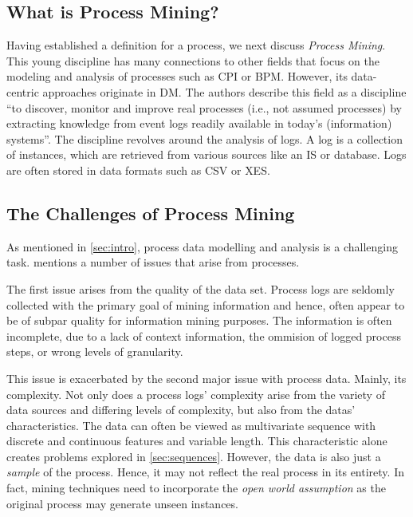 \documentclass[./../../paper.tex]{subfiles}
\begin{document}
\subsection{What is Process Mining?}
Having established a definition for a process, we next discuss \emph{Process Mining}. This young discipline has many connections to other fields that focus on the modeling and analysis of processes such as \gls{CPI} or \gls{BPM}\autocite{vanderaalst_ProcessMiningManifesto_2012}. However, its data-centric approaches originate in \gls{DM}.
The authors \citeauthor{vanderaalst_ProcessMiningManifesto_2012} describe this field as a discipline \enquote{to discover, monitor and improve real processes (i.e., not assumed processes) by extracting knowledge from event logs readily available in today's (information) systems}\autocite{vanderaalst_ProcessMiningManifesto_2012}. The discipline revolves around the analysis of \glspl{log}.
A \gls{log} is a collection of \glspl{instance}, which are retrieved from various sources like an \gls{IS} or database. Logs are often stored in data formats such as \gls{CSV} or \gls{XES}\needscite{}.

\subsection{The Challenges of Process Mining}
As mentioned in \autoref{sec:intro}, process data modelling and analysis is a challenging task. \citeauthor{vanderaalst_ProcessMiningManifesto_2012} mentions a number of issues that arise from processes\autocite{vanderaalst_ProcessMiningManifesto_2012}.

The first issue arises from the quality of the data set. Process logs are seldomly collected with the primary goal of mining information and hence, often appear to be of subpar quality for information mining purposes. The information is often incomplete, due to a lack of context information, the ommision of logged process steps, or wrong levels of granularity\autocite{vanderaalst_ProcessMiningManifesto_2012}.

This issue is exacerbated by the second major issue with process data. Mainly, its complexity. Not only does a process logs' complexity arise from the variety of data sources and differing levels of complexity, but also from the datas' characteristics. The data can often be viewed as multivariate sequence with discrete and continuous features and variable length. This characteristic alone creates problems explored in \autoref{sec:sequences}. However, the data is also just a \emph{sample} of the process. Hence, it may not reflect the real process in its entirety. In fact, mining techniques need to incorporate the \emph{open world assumption} as the original process may generate unseen \glspl{instance}\autocite{vanderaalst_ProcessMiningManifesto_2012}.
\end{document}
